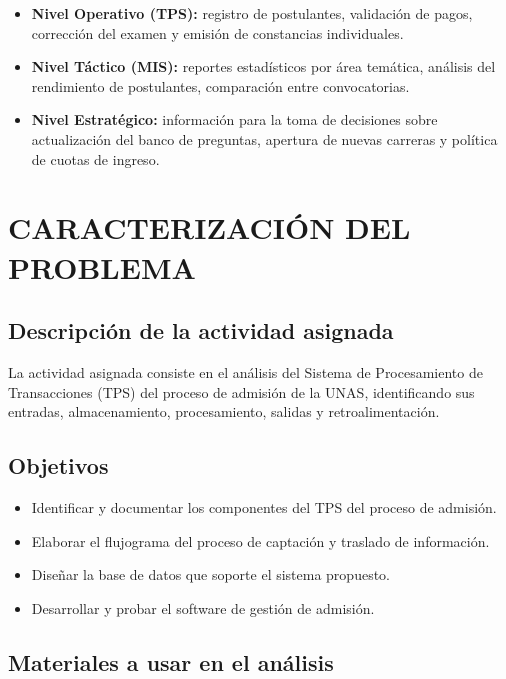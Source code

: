 \documentclass[12pt, a4paper]{report}
\begin{document}
\begin{itemize}[noitemsep]
  \item \textbf{Nivel Operativo (TPS):} registro de postulantes, validación de pagos, corrección del examen y emisión de constancias individuales.
  \item \textbf{Nivel Táctico (MIS):} reportes estadísticos por área temática, análisis del rendimiento de postulantes, comparación entre convocatorias.
  \item \textbf{Nivel Estratégico:} información para la toma de decisiones sobre actualización del banco de preguntas, apertura de nuevas carreras y política de cuotas de ingreso.
\end{itemize}

\section{CARACTERIZACIÓN DEL PROBLEMA}

\subsection{Descripción de la actividad asignada}

La actividad asignada consiste en el análisis del Sistema de Procesamiento de Transacciones (TPS) del proceso de admisión de la UNAS, identificando sus entradas, almacenamiento, procesamiento, salidas y retroalimentación.

\subsection{Objetivos}

\begin{itemize}[noitemsep]
  \item Identificar y documentar los componentes del TPS del proceso de admisión.
  \item Elaborar el flujograma del proceso de captación y traslado de información.
  \item Diseñar la base de datos que soporte el sistema propuesto.
  \item Desarrollar y probar el software de gestión de admisión.
\end{itemize}

\subsection{Materiales a usar en el análisis}
\end{document}
